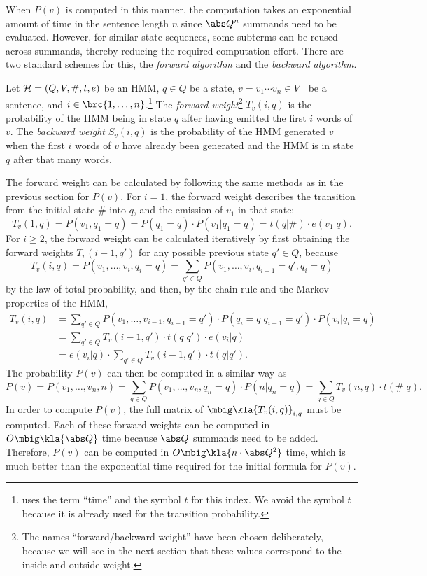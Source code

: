 When $P(v)$ is computed in this manner, the computation takes an exponential
amount of time in the sentence length $n$ since $\abs Q^n$ summands need to be
evaluated. However, for similar state sequences, some subterms can be reused
across summands, thereby reducing the required computation effort. There are
two standard schemes for this, the \emph{forward algorithm} and the
\emph{backward algorithm}.

\begin{definition}
 Let $\mathcal H=(Q,V,\#,t,e)$ be an HMM, $q\in Q$ be a state, $v=v_1\cdots v_n\in V^+$
 be a sentence, and $i\in\brc{1,\ldots,n}$.\footnote{\cite{jm09} uses the
 term ``time'' and the symbol $t$ for this index. We avoid the symbol $t$
 because it is already used for the transition probability.} The \emph{forward
 weight}\footnote{The names ``forward/backward weight'' have been chosen
 deliberately, because we will see in the next section that these values
 correspond to the inside and outside weight.} $T_v(i,q)$ is the probability
 of the HMM being in state $q$ after having emitted the first $i$ words of
 $v$. The \emph{backward weight} $S_v(i,q)$ is the probability of the HMM
 generated $v$ when the first $i$ words of $v$ have already been generated and
 the HMM is in state $q$ after that many words.
\end{definition}

The forward weight can be calculated by following the same methods as in the
previous section for $P(v)$. For $i = 1$, the forward weight describes the
transition from the initial state $\#$ into $q$, and the emission of $v_1$ in
that state:
\[
 T_v(1,q) = P(v_1,q_1=q) = P(q_1=q) \cdot P(v_1|q_1=q) = t(q|\#) \cdot e(v_1|q).
\]
For $i\geq 2$, the forward weight can be calculated iteratively by first
obtaining the forward weights $T_v(i-1,q')$ for any possible previous state
$q'\in Q$, because
\[
 T_v(i,q) = P(v_1,\ldots,v_i,q_i=q) = \sum_{q'\in Q} P(v_1,\ldots,v_i,q_{i-1}=q',q_i=q)
\]
by the law of total probability, and then, by the chain rule and the Markov
properties of the HMM,
\begin{align*}
 T_v(i,q)
  &= \sum_{q'\in Q} P(v_1,\ldots,v_{i-1},q_{i-1}=q') \cdot P(q_i=q|q_{i-1}=q') \cdot P(v_i|q_i=q) \\
  &= \sum_{q'\in Q} T_v(i-1,q') \cdot t(q|q') \cdot e(v_i|q) \\
  &= e(v_i|q) \cdot \sum_{q'\in Q} T_v(i-1,q') \cdot t(q|q').
\end{align*}
The probability $P(v)$ can then be computed in a similar way as
\[
 P(v) = P(v_1,\ldots,v_n,n) = \sum_{q\in Q} P(v_1,\ldots,v_n,q_n=q) \cdot P(n|q_n=q) = \sum_{q\in Q} T_v(n,q) \cdot t(\#|q).
\]
In order to compute $P(v)$, the full matrix of $\mbig\kla{T_v(i,q)}_{i,q}$ must
be computed. Each of these forward weights can be computed in $O\mbig\kla{\abs
Q}$ time because $\abs Q$ summands need to be added. Therefore, $P(v)$ can be
computed in $O\mbig\kla{n \cdot \abs Q^2}$ time, which is much better than the
exponential time required for the initial formula for $P(v)$.

